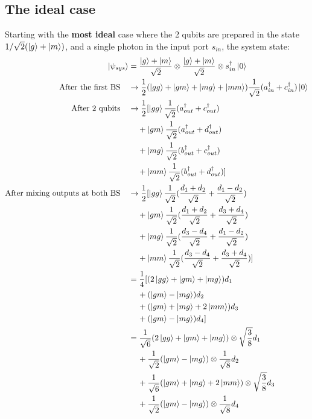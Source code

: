 \documentclass[letterpaper,10pt]{article}
\begin{document}
\subsection{The ideal case}
\label{subsec:DIT_ideal}
Starting with the \textbf{most ideal} case where the 2 qubits are prepared in the state $1/\sqrt{2}(\Ket{g}+\Ket{m})$, and a single photon in the input port $s_{in}$, the system state:
\begin{align*}
	\Ket{\psi_{sys}} &= \frac{\Ket{g}+\Ket{m}}{\sqrt{2}}\otimes\frac{\Ket{g}+\Ket{m}}{\sqrt{2}}\otimes s_{in}^\dag\Ket{0}\\
	\textrm{After the first BS}\quad &\rightarrow \frac{1}{2}(\Ket{gg}+\Ket{gm}+\Ket{mg}+\Ket{mm})\frac{1}{\sqrt{2}}(a_{in}^\dag+c_{in}^\dag)\Ket{0}\\
	\textrm{After 2 qubits}\quad &\rightarrow\frac{1}{2}[\Ket{gg}\frac{1}{\sqrt{2}}(a_{out}^\dag+c_{out}^\dag)\\
	&\quad\,+\Ket{gm}\frac{1}{\sqrt{2}}(a_{out}^\dag+d_{out}^\dag)\\
	&\quad\,+\Ket{mg}\frac{1}{\sqrt{2}}(b_{out}^\dag+c_{out}^\dag)\\
	&\quad\,+\Ket{mm}\frac{1}{\sqrt{2}}(b_{out}^\dag+d_{out}^\dag)]\\
	\textrm{After mixing outputs at both BS}\quad &\rightarrow\frac{1}{2}[\Ket{gg}\frac{1}{\sqrt{2}}(\frac{d_1+d_2}{\sqrt{2}}+\frac{d_1-d_2}{\sqrt{2}})\\
	&\quad\,+\Ket{gm}\frac{1}{\sqrt{2}}(\frac{d_1+d_2}{\sqrt{2}}+\frac{d_3+d_4}{\sqrt{2}})\\
	&\quad\,+\Ket{mg}\frac{1}{\sqrt{2}}(\frac{d_3-d_4}{\sqrt{2}}+\frac{d_1-d_2}{\sqrt{2}})\\
	&\quad\,+\Ket{mm}\frac{1}{\sqrt{2}}(\frac{d_3-d_4}{\sqrt{2}}+\frac{d_3+d_4}{\sqrt{2}})]\\
	&=\frac{1}{4}[(2\Ket{gg}+\Ket{gm}+\Ket{mg})d_1\\
	&\quad\,+(\Ket{gm}-\Ket{mg})d_2\\
	&\quad\,+(\Ket{gm}+\Ket{mg}+2\Ket{mm})d_3\\
	&\quad\,+(\Ket{gm}-\Ket{mg})d_4]\\
	&=\frac{1}{\sqrt{6}}(2\Ket{gg}+\Ket{gm}+\Ket{mg})\otimes\sqrt{\frac{3}{8}}d_1\\
	&\quad\, +\frac{1}{\sqrt{2}}(\Ket{gm}-\Ket{mg})\otimes\frac{1}{\sqrt{8}}d_2\\
	&\quad\, +\frac{1}{\sqrt{6}}(\Ket{gm}+\Ket{mg}+2\Ket{mm})\otimes\sqrt{\frac{3}{8}}d_3\\
	&\quad\, +\frac{1}{\sqrt{2}}(\Ket{gm}-\Ket{mg})\otimes\frac{1}{\sqrt{8}}d_4
\end{align*}
\end{document}
